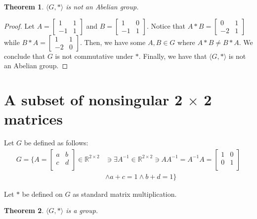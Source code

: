 \documentclass[12pt]{article}
\newcommand{\reals}{\mathbb{R}}
\newtheorem{thm}{Theorem}
\begin{document}
\begin{thm} \label{abel}
	$\langle G, * \rangle $ is not an Abelian group.
\end{thm}

\begin{proof}
	Let $A = \begin{bmatrix} 1 & 1 \\ -1 & 1 \end{bmatrix}$
	and $B = \begin{bmatrix} 1 & 0 \\ -1 & 1 \end{bmatrix}$.
	Notice that $A * B = \begin{bmatrix} 0 & 1 \\ -2 & 1 \end{bmatrix}$
	while $B * A = \begin{bmatrix} 1 & 1 \\ -2 & 0 \end{bmatrix}$.
	Then, we have some $A,B \in G$ where $A * B \neq B * A$.
	We conclude that $G$ is not commutative under $*$.
	Finally, we have that $\langle G, * \rangle$ is not an Abelian group.
\end{proof}

\section{A subset of nonsingular 2 $\times$ 2 matrices}


Let $G$ be defined as follows:
\begin{align*}
	G = \{A = \begin{bmatrix} a & b \\ c & d \\ \end{bmatrix} \in \reals^{2 \times 2} &
	\ni \exists A^{-1} \in \reals^{2 \times 2} \ni AA^{-1} = A^{-1}A = \begin{bmatrix} 1 & 0 \\ 0 & 1 \\ \end{bmatrix}
\\ & \land a + c = 1 \land b + d = 1\}
\end{align*}

Let $*$ be defined on $G$ as standard matrix multiplication.

\begin{thm} \label{thm:unitcols}
	$\langle G, * \rangle$ is a group.
\end{thm}
\end{document}
